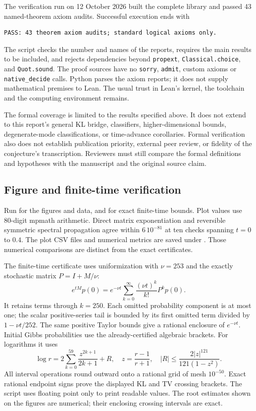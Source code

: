 \documentclass[11pt]{article}
\begin{document}
The verification run on 12 October 2026 built the complete library and
passed 43 named-theorem axiom audits. Successful execution ends with
\begin{verbatim}
PASS: 43 theorem axiom audits; standard logical axioms only.
\end{verbatim}
The script checks the number and names of the reports, requires the main
results to be included, and rejects dependencies beyond \texttt{propext},
\texttt{Classical.choice}, and \texttt{Quot.sound}. The proof sources have
no \texttt{sorry}, \texttt{admit}, custom axioms or \texttt{native\_decide}
calls. Python parses the axiom reports; it does not supply mathematical
premises to Lean. The usual trust in Lean's kernel, the toolchain and the
computing environment remains.

The formal coverage is limited to the results specified above. It does not
extend to this report's general KL bridge, classifiers, higher-dimensional
bounds, degenerate-mode classifications, or time-advance corollaries.
Formal verification also does not establish publication priority, external
peer review, or fidelity of the conjecture's transcription. Reviewers must
still compare the formal definitions and hypotheses with the manuscript
and the original source claim.


\subsection{Figure and finite-time verification}
Run  for the figures and data, and  for exact finite-time bounds. Plot values use 80-digit mpmath arithmetic. Direct matrix exponentiation and reversible symmetric spectral propagation agree within $6\,10^{-81}$ at ten checks spanning $t=0$ to $0.4$. The plot CSV files and numerical metrics are saved under . Those numerical comparisons are distinct from the exact certificates.

The finite-time certificate uses uniformization with $\nu=253$ and the exactly stochastic matrix $P=I+M/\nu$:
\[
e^{tM}p(0)=e^{-\nu t}\sum_{k=0}^{\infty}\frac{(\nu t)^k}{k!}P^kp(0).
\]
It retains terms through $k=250$. Each omitted probability component is at most one; the scalar positive-series tail is bounded by its first omitted term divided by $1-\nu t/252$. The same positive Taylor bounds give a rational enclosure of $e^{-\nu t}$. Initial Gibbs probabilities use the already-certified algebraic brackets. For logarithms it uses
\[
\log r=2\sum_{k=0}^{59}\frac{z^{2k+1}}{2k+1}+R,
\quad z=\frac{r-1}{r+1},\quad
|R|\leq\frac{2|z|^{121}}{121(1-z^2)}.
\]
All interval operations round outward onto a rational grid of mesh $10^{-50}$. Exact rational endpoint signs prove the displayed KL and TV crossing brackets. The script uses floating point only to print readable values. The root estimates shown on the figures are numerical; their enclosing crossing intervals are exact.
\end{document}
